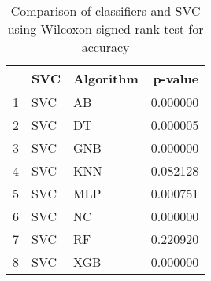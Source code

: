 \begin{table}
\footnotesize
\caption{Comparison of classifiers and SVC using Wilcoxon signed-rank test for accuracy}
\label{tab:SVC wilcoxon ACC comparison}
\begin{tabular}{lllr}
\hline
 & SVC & Algorithm & p-value \\
\hline
1 & SVC & AB & 0.000000 \\
2 & SVC & DT & 0.000005 \\
3 & SVC & GNB & 0.000000 \\
4 & SVC & KNN & 0.082128 \\
5 & SVC & MLP & 0.000751 \\
6 & SVC & NC & 0.000000 \\
7 & SVC & RF & 0.220920 \\
8 & SVC & XGB & 0.000000 \\
\hline
\end{tabular}
\end{table}
